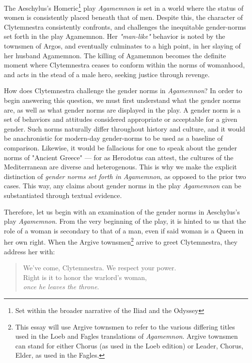 
The Aeschylus's Homeric\footnote{Set within the broader narrative of the Iliad
and the Odyssey} play \emph{Agamemnon} is set in a world where the status of
women is consistently placed beneath that of men. Despite this, the character of
Clytemnestra consistently confronts, and challenges the inequitable gender-norms
set forth in the play Agamemnon. Her \emph{"man-like"} behavior is noted by the
townsmen of Argos, and eventually culminates to a high point, in her slaying of
her husband Agamemnon. The killing of Agamemnon becomes the definite moment
where Clytemnestra ceases to conform within the norms of womanhood, and acts in
the stead of a male hero, seeking justice through revenge.

How does Clytemnestra challenge the gender norms in \emph{Agamemnon}? In order
to begin answering this question, we must first understand what the gender norms
are, as well as what gender norms are displayed in the play. A gender norm is a
set of behaviors and attitudes considered appropriate or acceptable for a given
gender. Such norms naturally differ throughout history and culture, and it
would be anachronistic for modern-day gender-norms to be used as a baseline
of comparison. Likewise, it would be fallacious for one to speak about the
gender norms of "Ancient Greece" --- for as Herodotus can attest, the cultures
of the Mediterranean are diverse and heterogenous. This is why we make the
explicit distinction of \emph{gender norms set forth in Agamemnon}, as opposed
to the prior two cases. This way, any claims about gender norms in the play
\emph{Agamemnon} can be substantiated through textual evidence.

Therefore, let us begin with an examination of the gender norms in Aeschylus's
play \emph{Agamemnon}. From the very beginning of the play, it is hinted to us
that the role of a woman is secondary to that of a man, even if said woman is a
Queen in her own right. When the Argive townsmen\footnote{This essay
will use Argive townsmen to refer to the various differing titles used in the
Loeb and Fagles translations of \emph{Agamemnon}. Argive townsmen can stand for
either Chorus (as used in the Loeb edition) or Leader, Chorus, Elder, as used in
the Fagles.} arrive to greet Clytemnestra, they address her with:

\begin{quote}
    We've come, Clytemnestra. We respect your power. \\
    Right is it to honor the warlord's woman, \\
    \textit{once he leaves the throne}.

    \autocite[258]{fagles}
\end{quote}


